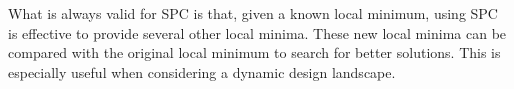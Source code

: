 \begin{comment}
Despite the fact that not all the local minima can be reached by SPC, we observe that in all the investigated cases these unreachable solutions are usually the ones with high merit function values. The best solutions are always obtainable via SPC. To be fully confident about SPC's application in lens design, this leads to our next research question.

\vspace{1em}

\textbf{Question 3}: Does the saddle points - minima network obtained via SPC always contain the best or the best pool of solutions for lens design? 

We cannot answer this question within our research. It is a difficult task to prove the positive statement of this question and neither have we observed any case to falsify it. If the answer to this question is yes, from our point of view, it implies the following hypotheses:

\begin{enumerate}[nosep]
\item The good and best solutions in a lens design network are more stable compared to the bad solutions;
\item The stable part of the design landscape exhibits certain properties which can be captured by the saddle points - minima network obtained via multiple SPC scans.
\end{enumerate}


To better verify these hypotheses, a deeper understanding of the lens design landscape is necessary. We propose some possible research directions in the next section. 

\vspace{1em}
\end{comment}

What is always valid for SPC is that, given a known local minimum, using SPC is effective to provide several other local minima. These new local minima can be compared with the original local minimum to search for better solutions. This is especially useful when considering a dynamic design landscape. 

